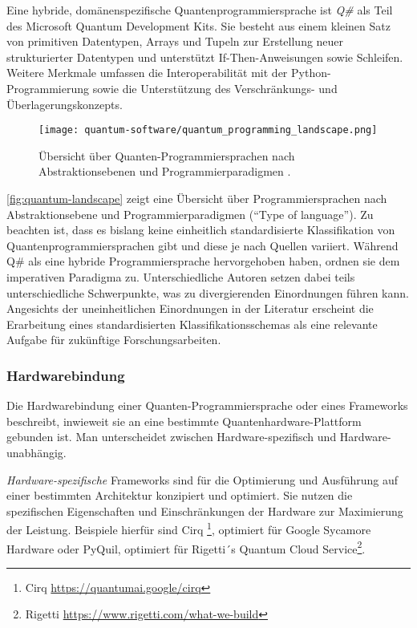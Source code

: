 Eine hybride, domänenspezifische Quantenprogrammiersprache ist \textit{Q\#} als Teil des Microsoft Quantum Development Kits. Sie besteht aus einem kleinen Satz von primitiven Datentypen, Arrays und Tupeln zur Erstellung neuer strukturierter Datentypen und unterstützt If-Then-Anweisungen sowie Schleifen. Weitere Merkmale umfassen die Interoperabilität mit der Python-Programmierung sowie die Unterstützung des Verschränkungs- und Überlagerungskonzepts. \autocite{garhwal_quantum_2021}

\begin{figure}[ht!]
    \centering
    \texttt{[image: quantum-software/quantum\_programming\_landscape.png]}
    \caption{Übersicht über Quanten-Programmiersprachen nach Abstraktionsebenen und Programmierparadigmen \autocite[][]{serrano_quantum_2023}.}
    \label{fig:quantum-landscape}
\end{figure}

\autoref{fig:quantum-landscape} zeigt eine Übersicht über Programmiersprachen nach Abstraktionsebene und Programmierparadigmen (\enquote{Type of language}). Zu beachten ist, dass es bislang keine einheitlich standardisierte Klassifikation von Quantenprogrammiersprachen gibt und diese je nach Quellen variiert. Während \citeauthor{garhwal_quantum_2021} Q\# als eine hybride Programmiersprache hervorgehoben haben, ordnen \citeauthor{serrano_quantum_2023} sie dem imperativen Paradigma zu. 
Unterschiedliche Autoren setzen dabei teils unterschiedliche Schwerpunkte, was zu divergierenden Einordnungen führen kann. Angesichts der uneinheitlichen Einordnungen in der Literatur erscheint die Erarbeitung eines standardisierten Klassifikationsschemas als eine relevante Aufgabe für zukünftige Forschungsarbeiten.

\subsubsection*{Hardwarebindung}

Die Hardwarebindung einer Quanten-Pro\-gram\-mier\-sprache oder eines Frameworks beschreibt, inwieweit sie an eine bestimmte Quanten\-hardware-Plattform gebunden ist. Man unterscheidet zwischen Hardware-spezifisch und Hardware-unabhängig.

\textit{Hardware-spezifische} Frameworks sind für die Optimierung und Ausführung auf einer bestimmten Architektur konzipiert und optimiert. Sie nutzen die spezifischen Eigenschaften und Einschränkungen der Hardware zur Maximierung der Leistung. Beispiele hierfür sind Cirq \footnote{Cirq \url{https://quantumai.google/cirq}}, optimiert für Google Sycamore Hardware oder PyQuil, optimiert für Rigetti´s Quantum Cloud Service\footnote{Rigetti \url{https://www.rigetti.com/what-we-build}}. 

